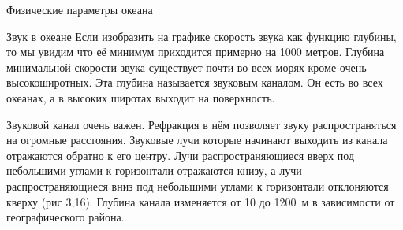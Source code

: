 \begin{chapter}{Физические параметры океана}
\begin{section}{Звук в океане}
Если изобразить на графике скорость звука как функцию глубины, то мы
увидим что её минимум приходится примерно на 1000 метров. Глубина
минимальной скорости звука существует почти во всех морях кроме очень
высокоширотных. Эта глубина называется звуковым каналом. Он есть во
всех океанах, а в высоких широтах выходит на поверхность.
%

Звуковой канал очень важен. Рефракция в нём позволяет звуку
распространяться на огромные расстояния. Звуковые лучи которые
начинают выходить из канала отражаются обратно к его центру. Лучи
распространяющиеся вверх под небольшими углами к горизонтали
отражаются книзу, а лучи распространяющиеся вниз под небольшими углами
к горизонтали отклоняются кверху (рис 3,16). Глубина канала изменяется
от 10 до 1200~м в зависимости от географического района.
%



\end{section}
\end{chapter}
